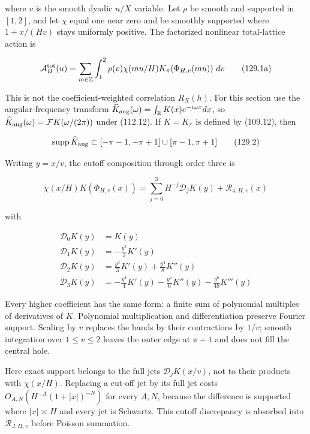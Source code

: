 \documentclass[
  11pt,
]{book}
\begin{document}
where \(v\) is the smooth dyadic \(n/X\) variable. Let \(\rho\) be
smooth and supported in \([1,2]\), and let \(\chi\) equal one near zero
and be smoothly supported where \(1+x/(Hv)\) stays uniformly positive.
The factorized nonlinear total-lattice action is

\[
\mathcal A_H^{\rm tot}(u)
=\sum_{m\in\mathbb Z}\int_1^2
\rho(v)\chi(mu/H)K_\pi\!\left(\Phi_{H,v}(mu)\right)\,dv
\tag{129.1a}
\]

This is not the coefficient-weighted correlation \(R_X(h)\). For this
section use the angular-frequency transform
\(\widehat K_{\rm ang}(\omega)=\int_{\mathbb R}K(x)e^{-i\omega x}dx\),
so \(\widehat K_{\rm ang}(\omega)=\mathcal FK(\omega/(2\pi))\) under
(112.12). If \(K=K_\pi\) is defined by (109.12), then

\[
\operatorname{supp}\widehat K_{\rm ang}
\subset[-\pi-1,-\pi+1]\cup[\pi-1,\pi+1]
\tag{129.2}
\]

Writing \(y=x/v\), the cutoff composition through order three is

\[
\chi(x/H)K(\Phi_{H,v}(x))
=\sum_{j=0}^{3}H^{-j}\mathcal D_jK(y)
+\mathcal R_{4,H,v}(x)
\tag{129.3}
\]

with

\[
\begin{aligned}
\mathcal D_0K(y)&=K(y)\\
\mathcal D_1K(y)&=-\frac{y^2}{2}K'(y)\\
\mathcal D_2K(y)&=\frac{y^3}{3}K'(y)
                  +\frac{y^4}{8}K''(y)\\
\mathcal D_3K(y)&=-\frac{y^4}{4}K'(y)
                  -\frac{y^5}{6}K''(y)
                  -\frac{y^6}{48}K'''(y)
\end{aligned}
\tag{129.4}
\]

Every higher coefficient has the same form: a finite sum of polynomial
multiples of derivatives of \(K\). Polynomial multiplication and
differentiation preserve Fourier support. Scaling by \(v\) replaces the
bands by their contractions by \(1/v\); smooth integration over
\(1\le v\le2\) leaves the outer edge at \(\pi+1\) and does not fill the
central hole.

Here exact support belongs to the full jets \(\mathcal D_jK(x/v)\), not
to their products with \(\chi(x/H)\). Replacing a cut-off jet by its
full jet costs \(O_{A,N}(H^{-A}(1+|x|)^{-N})\) for every \(A,N\),
because the difference is supported where \(|x|\asymp H\) and every jet
is Schwartz. This cutoff discrepancy is absorbed into
\(\mathcal R_{J,H,v}\) before Poisson summation.
\end{document}
